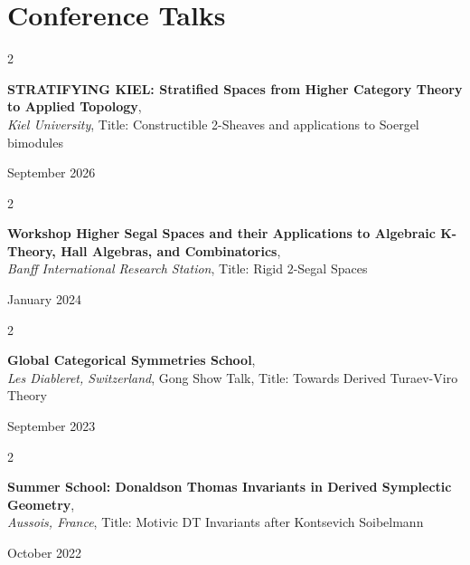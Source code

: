 \documentclass[10pt, letterpaper]{article}
\newenvironment{twocolentry}[2][]{
    \onecolentry
    \def\secondColumn{#2}
    \setcolumnwidth{\fill, 4.5 cm}
    \begin{paracol}{2}
}{
    \switchcolumn \raggedleft \secondColumn
    \end{paracol}
    \endonecolentry
} %
\begin{document}
\vspace{0.2cm}


    
\section{Conference Talks}

    \begin{twocolentry}{

    September 2026
           
        }
            \textbf{STRATIFYING KIEL: Stratified Spaces from Higher Category Theory to Applied Topology}, \\
            \textit{Kiel University}, Title: Constructible 2-Sheaves and applications to Soergel bimodules
            
        \end{twocolentry}
      \vspace{0.2 cm}

     \begin{twocolentry}{

    January 2024
           
        }
            \textbf{Workshop Higher Segal Spaces and their Applications to Algebraic K-Theory, Hall Algebras, and Combinatorics}, \\
            \textit{Banff International Research Station}, Title: Rigid $2$-Segal Spaces
            
           
        \end{twocolentry}
      \vspace{0.2 cm}
        \begin{twocolentry}{

    September 2023
           
        }
            \textbf{Global Categorical Symmetries School}, \\
            \textit{Les Diableret, Switzerland}, Gong Show Talk, Title: Towards Derived Turaev-Viro Theory 
            
           
        \end{twocolentry}

    \vspace{0.2cm}

     \begin{twocolentry}{

    October 2022
           
        }
            \textbf{Summer School: Donaldson Thomas Invariants in Derived Symplectic Geometry}, \\
            \textit{Aussois, France},  Title: Motivic DT Invariants after Kontsevich Soibelmann
            
           
        \end{twocolentry}
        
\end{document}
